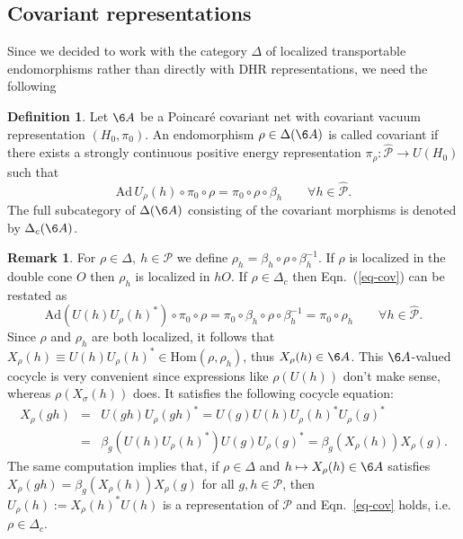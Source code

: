 \documentclass[12pt]{article}
\theoremstyle{definition}
\theoremstyle{definition}
\newtheorem{defn}[thm]{Definition}
\newtheorem{note}[thm]{Remark}
\theoremstyle{remark}
\def\2#1{{\mathcal #1}}
\newcommand{\Hom}{\mathrm{Hom}}
\newcommand{\rarr}{\rightarrow}
\begin{document}
\subsection{Covariant representations} \label{ss-cov}
Since we decided to work with the category $\Delta$ of
localized transportable endomorphisms rather than
directly with DHR representations, we need the
following

\begin{defn} Let $\6A$ be a Poincar\'e covariant net
  with covariant vacuum representation
  $(H_0,\pi_0)$. An endomorphism $\rho\in\Delta(\6A)$
  is called covariant if there exists a strongly
  continuous positive energy representation $\pi_\rho:
  \widehat{\2P}\rarr U(H_0)$ such that
  \begin{equation} \label{eq-cov}
    \mathrm{Ad}\,U_\rho(h)\circ\pi_0\circ\rho=\pi_0\circ\rho\circ\beta_h\quad\quad\forall
    h\in\widehat{\2P}. \end{equation} The full
  subcategory of $\Delta(\6A)$ consisting of the
  covariant morphisms is denoted by $\Delta_c(\6A)$.
\end{defn}

\begin{note} \label{note-cov1} For $\rho\in\Delta,\
  h\in\2P$ we define
  $\rho_h=\beta_h\circ\rho\circ\beta_h^{-1}$. If $\rho$
  is localized in the double cone $O$ then $\rho_h$ is
  localized in $hO$. If $\rho\in\Delta_c$ then Eqn.\
  (\ref{eq-cov}) can be restated as
  \[ \mathrm{Ad}(U(h)U_\rho(h)^*)\circ\pi_0\circ\rho
  =\pi_0\circ\beta_h\circ\rho\circ\beta_h^{-1}
  =\pi_0\circ\rho_h \quad\quad\forall
  h\in\widehat{\2P}. \] Since $\rho$ and $\rho_h$ are
  both localized, it follows that $X_\rho(h)\equiv
  U(h)U_\rho(h)^*\in\Hom(\rho,\rho_h)$, thus
  $X_\rho(h)\in\6A$.  This $\6A$-valued cocycle is very
  convenient since expressions like $\rho(U(h))$ don't
  make sense, whereas $\rho(X_\sigma(h))$ does. It
  satisfies the following cocycle equation:
\begin{eqnarray*} X_\rho(gh) &=& U(gh)U_\rho(gh)^*=U(g)U(h)U_\rho(h)^*U_\rho(g)^* \\
   &=& \beta_g(U(h)U_\rho(h)^*)U(g)U_\rho(g)^* =  \beta_g(X_\rho(h))X_\rho(g). 
\end{eqnarray*}
The same computation implies that, if $\rho\in\Delta$
and $h\mapsto X_\rho(h)\in\6A$ satisfies
$X_\rho(gh)=\beta_g(X_\rho(h))X_\rho(g)$ for all
$g,h\in\2P$, then $U_\rho(h):=X_\rho(h)^*U(h)$ is a
representation of $\2P$ and Eqn.\ \ref{eq-cov} holds,
i.e.\ $\rho\in\Delta_c$.
\end{note}
\end{document}
